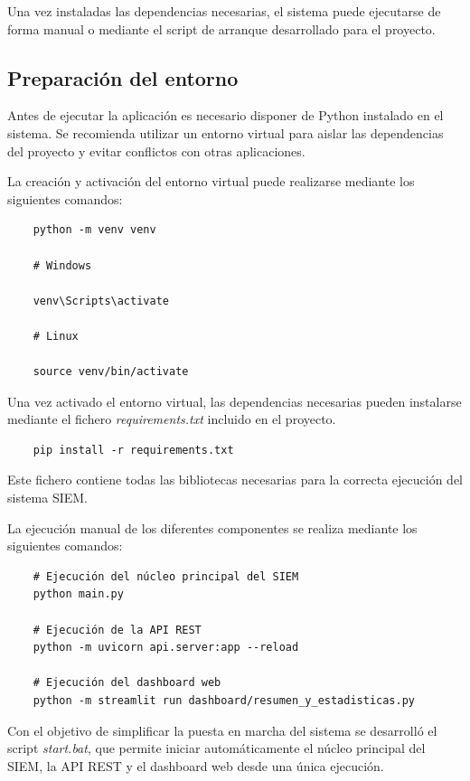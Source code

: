 Una vez instaladas las dependencias necesarias, el sistema puede ejecutarse de forma manual o mediante el script de arranque desarrollado para el proyecto.

\subsection{Preparación del entorno}

Antes de ejecutar la aplicación es necesario disponer de Python instalado en el sistema. Se recomienda utilizar un entorno virtual para aislar las dependencias del proyecto y evitar conflictos con otras aplicaciones.

La creación y activación del entorno virtual puede realizarse mediante los siguientes comandos:

\begin{verbatim}
	python -m venv venv
	
	# Windows
	
	venv\Scripts\activate
	
	# Linux
	
	source venv/bin/activate
\end{verbatim}

Una vez activado el entorno virtual, las dependencias necesarias pueden instalarse mediante el fichero \textit{requirements.txt} incluido en el proyecto.

\begin{verbatim}
	pip install -r requirements.txt
\end{verbatim}

Este fichero contiene todas las bibliotecas necesarias para la correcta ejecución del sistema SIEM.

La ejecución manual de los diferentes componentes se realiza mediante los siguientes comandos:

\begin{verbatim}
	# Ejecución del núcleo principal del SIEM
	python main.py
	
	# Ejecución de la API REST
	python -m uvicorn api.server:app --reload
	
	# Ejecución del dashboard web
	python -m streamlit run dashboard/resumen_y_estadisticas.py
\end{verbatim}

Con el objetivo de simplificar la puesta en marcha del sistema se desarrolló el script \textit{start.bat}, que permite iniciar automáticamente el núcleo principal del SIEM, la API REST y el dashboard web desde una única ejecución.


